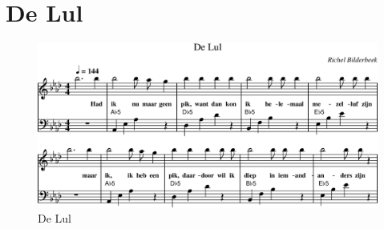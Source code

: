 \chapter{De Lul}



\begin{figure}[!htbp]
  \includegraphics[width=\textwidth,height=\textheight,keepaspectratio]{../songs/24_de_lul.png}
  \caption{De Lul}
  \label{fig:24_de_lul}
\end{figure}
